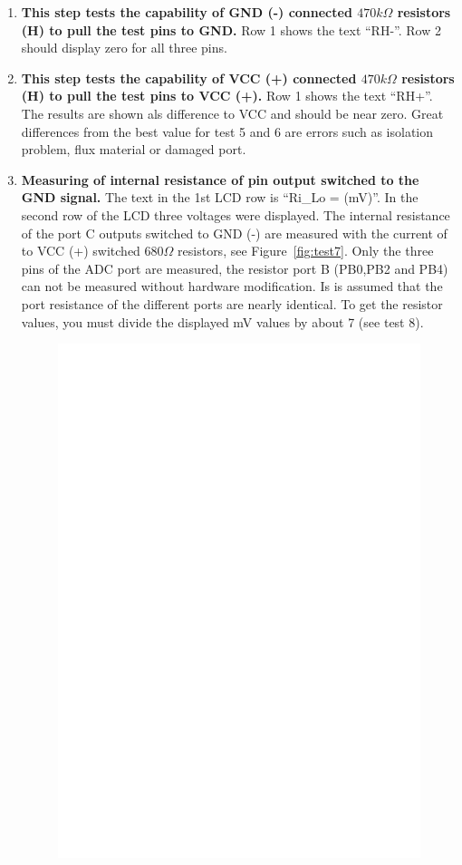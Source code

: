 \begin{enumerate}
\item {\bf This step tests the capability of GND (-) connected \(470k\Omega\) resistors (H) to pull the test pins to GND.}
Row 1 shows the text  ``RH-''.
Row 2 should display zero for all three pins.

\item {\bf This step tests the capability of VCC (+) connected \(470k\Omega\) resistors (H) to pull the test pins  to VCC (+).}
Row 1 shows the text ``RH+''.
The results are shown als difference to VCC and should be near zero.
 Great differences from the best value for test 5 and 6 are errors  such as isolation problem, flux material or damaged port.

\item {\bf Measuring of internal resistance of pin output switched to the GND signal.}
The text in the 1st LCD row is ``Ri\_Lo = (mV)''.
In the second row of the LCD three voltages were displayed.
The internal resistance of the port C outputs switched to GND (-) are measured with the current
of to VCC (+) switched \(680\Omega\) resistors, see Figure~\ref{fig:test7}.
Only the three pins of the ADC port are measured, the resistor port B (PB0,PB2 and PB4) can not be measured
without hardware modification.
Is is assumed that the port resistance of the different ports are nearly identical.
To get the resistor values, you must divide the displayed mV values by about 7 (see test 8). 
\begin{figure}[H]
\centering
\includegraphics[]{../FIG/Test7.eps}

\end{figure}
\end{enumerate}
